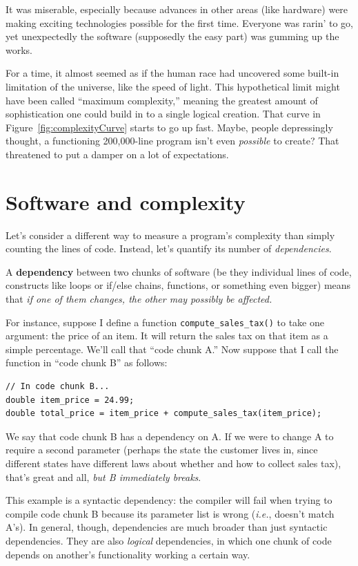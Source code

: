 It was miserable, especially because advances in other areas (like hardware)
were making exciting technologies possible for the first time. Everyone was
rarin' to go, yet unexpectedly the software (supposedly the easy part) was
gumming up the works.

For a time, it almost seemed as if the human race had uncovered some built-in
limitation of the universe, like the speed of light. This hypothetical limit
might have been called ``maximum complexity,'' meaning the greatest amount of
sophistication one could build in to a single logical creation. That curve in
Figure~\ref{fig:complexityCurve} starts to go up fast. Maybe, people
depressingly thought, a functioning 200,000-line program isn't even
\textit{possible} to create? That threatened to put a damper on a lot of
expectations.

\section{Software and complexity}

Let's consider a different way to measure a program's complexity than simply
counting the lines of code. Instead, let's quantify its number of
\textit{dependencies}.

A \textbf{dependency} between two chunks of software (be they individual lines
of code, constructs like loops or if/else chains, functions, or something even
bigger) means that \textit{if one of them changes, the other may possibly be
affected.}

For instance, suppose I define a function \texttt{compute\_sales\_tax()} to
take one argument: the price of an item. It will return the sales tax on that
item as a simple percentage. We'll call that ``code chunk A.'' Now suppose
that I call the function in ``code chunk B'' as follows:

\begin{Verbatim}[fontsize=\small,samepage=true,frame=single]
// In code chunk B...
double item_price = 24.99;
double total_price = item_price + compute_sales_tax(item_price);
\end{Verbatim}

We say that code chunk B has a dependency on A. If we were to change A to
require a second parameter (perhaps the state the customer lives in, since
different states have different laws about whether and how to collect sales
tax), that's great and all, \textit{but B immediately breaks}.

This example is a syntactic dependency: the compiler will fail when trying to
compile code chunk B because its parameter list is wrong (\textit{i.e.},
doesn't match A's). In general, though, dependencies are much broader than
just syntactic dependencies. They are also \textit{logical} dependencies, in
which one chunk of code depends on another's functionality working a certain
way.

